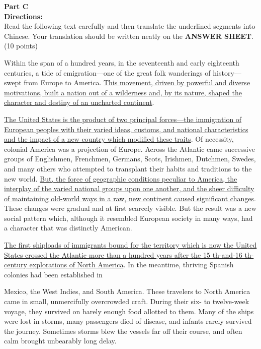 \newpage

\noindent
\textbf{Part C}\\
\textbf{Directions:}\\
Read the following text carefully and then translate the
	underlined segments into Chinese. Your translation should be written
	neatly on the \textbf{ANSWER SHEET}. (10 points)


\TiGanSpace

Within the span of a hundred years, in the seventeenth and early
eighteenth centuries, a tide of emigration---one of the great folk
wanderings of history---swept from Europe to America.
\transnum \uline{This movement, driven by powerful and diverse
	motivations, built a nation out of a wilderness and, by its nature,
	shaped the character and destiny of an uncharted continent}.

\transnum \uline{The United States is the product of two principal
	forces---the immigration of European peoples with their varied ideas,
	customs, and national characteristics and the impact of a new country
	which modified these traits}. Of necessity, colonial America was a
projection of Europe. Across the Atlantic came successive groups of
Englishmen, Frenchmen, Germans, Scots, Irishmen, Dutchmen, Swedes, and
many others who attempted to transplant their habits and traditions to
the new world. \transnum \uline{But, the force of geographic conditions
	peculiar to America, the interplay of the varied national groups upon
	one another, and the sheer difficulty of maintaining old-world ways in a
	raw, new continent caused significant changes}. These changes were
gradual and at first scarcely visible. But the result was a new social
pattern which, although it resembled European society in many ways, had
a character that was distinctly American.

\transnum \uline{The first shiploads of immigrants bound for the
	territory which is now the United States crossed the Atlantic more than
	a hundred years after the 15 th-and-16 th-century explorations of North
	America}. In the meantime, thriving Spanish colonies had been established
in

Mexico, the West Indies, and South America. These travelers to North
America came in small, unmercifully overcrowded craft. During their six-
to twelve-week voyage, they survived on barely enough food allotted to
them. Many of the ships were lost in storms, many passengers died of
disease, and infants rarely survived the journey. Sometimes storms blew
the vessels far off their course, and often calm brought unbearably long
delay.

